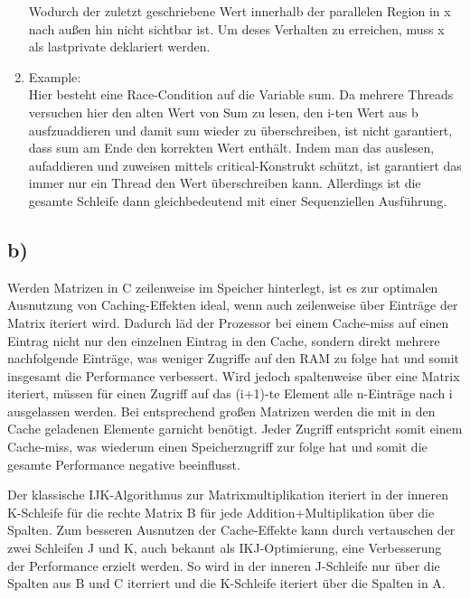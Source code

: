 \documentclass{article}
\begin{document}
\begin{enumerate}
				Wodurch der zuletzt geschriebene Wert innerhalb der parallelen Region in x nach außen hin nicht sichtbar ist.
				Um deses Verhalten zu erreichen, muss x als lastprivate deklariert werden.
			\item Example: \\
				Hier besteht eine Race-Condition auf die Variable sum. 
				Da mehrere Threads versuchen hier den alten Wert von Sum zu lesen, den i-ten Wert aus b ausfzuaddieren und damit sum wieder zu überschreiben, ist nicht garantiert, dass sum am Ende den korrekten Wert enthält.
				Indem man das auslesen, aufaddieren und zuweisen mittels critical-Konstrukt schützt, ist garantiert das immer nur ein Thread den Wert überschreiben kann.
				Allerdings ist die gesamte Schleife dann gleichbedeutend mit einer Sequenziellen Ausführung.
		\end{enumerate}

		\subsection{b)}
			Werden Matrizen in C zeilenweise im Speicher hinterlegt, ist es zur optimalen Ausnutzung von Caching-Effekten ideal, wenn auch zeilenweise über Einträge der Matrix iteriert wird.
			Dadurch läd der Prozessor bei einem Cache-miss auf einen Eintrag nicht nur den einzelnen Eintrag in den Cache, sondern direkt mehrere nachfolgende Einträge, was weniger Zugriffe auf den RAM zu folge hat und somit insgesamt die Performance verbessert.
			Wird jedoch spaltenweise über eine Matrix iteriert, müssen für einen Zugriff auf das (i+1)-te Element alle n-Einträge nach i ausgelassen werden. 
			Bei entsprechend großen Matrizen werden die mit in den Cache geladenen Elemente garnicht benötigt.
			Jeder Zugriff entspricht somit einem Cache-miss, was wiederum einen Speicherzugriff zur folge hat und somit die gesamte Performance negative beeinflusst.
			
			Der klassische IJK-Algorithmus zur Matrixmultiplikation iteriert in der inneren K-Schleife für die rechte Matrix B für jede Addition+Multiplikation über die Spalten.
			Zum besseren Ausnutzen der Cache-Effekte kann durch vertauschen der zwei Schleifen J und K, auch bekannt als IKJ-Optimierung, eine Verbesserung der Performance erzielt werden.
			So wird in der inneren J-Schleife nur über die Spalten aus B und C iterriert und die K-Schleife iteriert über die Spalten in A.
\end{document}
